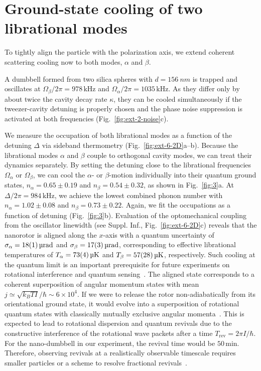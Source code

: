 \documentclass[reprint, amsmath, amssymb, superscriptaddress,showkeys,aps,pra]{revtex4-2}
\begin{document}
\section{Ground-state cooling of two librational modes}

To tightly align the particle with the polarization axis, we extend coherent scattering cooling now to both modes, $\alpha$ and $\beta$. 

A dumbbell formed from two silica spheres with $d=\qty{156}{nm}$ is trapped and oscillates at $\Omega_\beta/2\pi=978\,\text{kHz}$ and $\Omega_\alpha/2\pi=1035\,\text{kHz}$. As they differ only by about twice the cavity decay rate $\kappa$, they can be cooled simultaneously if the tweezer-cavity detuning is properly chosen and the phase noise suppression is activated at both frequencies (Fig.~\ref{fig:ext-2-noise}c).

We measure the occupation of both librational modes as a function of the detuning $\Delta$ via sideband thermometry (Fig.~\ref{fig:ext-6-2D}a--b). Because the librational modes $\alpha$ and $\beta$ couple to orthogonal cavity modes, we can treat their dynamics separately. By setting the detuning close to the librational frequencies $\Omega_\alpha$ or $\Omega_\beta$, we can cool the $\alpha$- or $\beta$-motion individually into their quantum ground states, $n_\alpha=0.65\pm0.19$ and $n_\beta= 0.54\pm0.32$, as shown in Fig.~\ref{fig:3}a. 
At $\Delta/2\pi=984\,\text{kHz}$, we achieve the lowest combined phonon number  with $n_\alpha=1.02\pm0.08$ and $n_\beta=0.73\pm0.22$. Again, we fit the occupations as a function of detuning (Fig.~\ref{fig:3}b). 
Evaluation of the optomechanical coupling from the oscillator linewidth (see Suppl. Inf., Fig.~\ref{fig:ext-6-2D}c) reveals that the nanorotor is aligned along the $x$-axis with a quantum uncertainty of $\sigma_\alpha=\qty{18\pm1}{\micro rad}$ and $\sigma_\beta=\qty{17\pm3}{\micro rad}$, corresponding to effective librational temperatures of $T_\alpha=\qty{73\pm4}{\micro K}$ and $T_\beta=\qty{57\pm28}{\micro K}$, respectively.
Such cooling at the quantum limit is an important prerequisite for future experiments on rotational interference and quantum sensing~\cite{stickler_quantum_2021}. The aligned state corresponds to a coherent superposition of angular momentum states with mean $j\simeq \sqrt{k_BTI}/\hbar\sim 6\times 10^4$.
If we were to release the rotor non-adiabatically from its orientational ground state, it would evolve into a superposition of rotational quantum states with classically mutually exclusive angular momenta~\cite{Stickler2018}.
This is expected to lead to rotational dispersion and quantum revivals due to the constructive interference of the rotational wave packets after a time $T_\text{rev}=2\pi I/\hbar$. For the nano-dumbbell in our experiment, the revival time would be $50\,\text{min}$. Therefore, observing revivals at a realistically observable timescale requires smaller particles or a scheme to resolve fractional revivals~\cite{Schrinski2022,Ivanov2004}.
\end{document}

